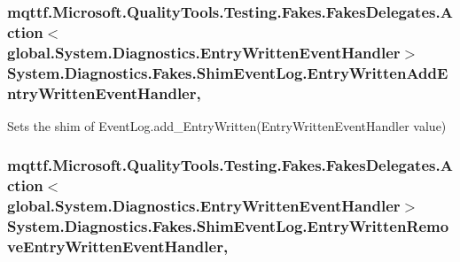 \hypertarget{class_system_1_1_diagnostics_1_1_fakes_1_1_shim_event_log_abab641197e70026b754e18f6078f5318}{
\subsubsection[{Entry\-Written\-Add\-Entry\-Written\-Event\-Handler}]{\setlength{\rightskip}{0pt plus 5cm}mqttf.\-Microsoft.\-Quality\-Tools.\-Testing.\-Fakes.\-Fakes\-Delegates.\-Action$<$global.\-System.\-Diagnostics.\-Entry\-Written\-Event\-Handler$>$ System.\-Diagnostics.\-Fakes.\-Shim\-Event\-Log.\-Entry\-Written\-Add\-Entry\-Written\-Event\-Handler\hspace{0.3cm}{\ttfamily [set]}, {\ttfamily [add]}}}\label{class_system_1_1_diagnostics_1_1_fakes_1_1_shim_event_log_abab641197e70026b754e18f6078f5318}


Sets the shim of Event\-Log.\-add\-\_\-\-Entry\-Written(\-Entry\-Written\-Event\-Handler value)

\hypertarget{class_system_1_1_diagnostics_1_1_fakes_1_1_shim_event_log_a504129f76e5a2c76072240100c5d1541}{
\subsubsection[{Entry\-Written\-Remove\-Entry\-Written\-Event\-Handler}]{\setlength{\rightskip}{0pt plus 5cm}mqttf.\-Microsoft.\-Quality\-Tools.\-Testing.\-Fakes.\-Fakes\-Delegates.\-Action$<$global.\-System.\-Diagnostics.\-Entry\-Written\-Event\-Handler$>$ System.\-Diagnostics.\-Fakes.\-Shim\-Event\-Log.\-Entry\-Written\-Remove\-Entry\-Written\-Event\-Handler\hspace{0.3cm}{\ttfamily [set]}, {\ttfamily [remove]}}}\label{class_system_1_1_diagnostics_1_1_fakes_1_1_shim_event_log_a504129f76e5a2c76072240100c5d1541}


